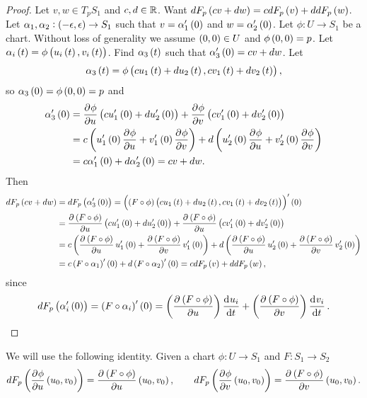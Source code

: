 \begin{proof}
Let $ v, w \in T_pS_1 $ and $ c, d \in \mathbb{R} $. Want $ dF_p\br{cv + dw} = cdF_p\br{v} + ddF_p\br{w} $. Let $ \alpha_1, \alpha_2 : \br{-\epsilon, \epsilon} \to S_1 $ such that $ v = \alpha_1'\br{0} $ and $ w = \alpha_2'\br{0} $. Let $ \phi : U \to S_1 $ be a chart. Without loss of generality we assume $ \br{0, 0} \in U $ and $ \phi\br{0, 0} = p $. Let $ \alpha_i\br{t} = \phi\br{u_i\br{t}, v_i\br{t}} $. Find $ \alpha_3\br{t} $ such that $ \alpha_3'\br{0} = cv + dw $. Let
$$ \alpha_3\br{t} = \phi\br{cu_1\br{t} + du_2\br{t}, cv_1\br{t} + dv_2\br{t}}, $$
so $ \alpha_3\br{0} = \phi\br{0, 0} = p $ and
\begin{align*}
\alpha_3'\br{0}
& = \dpd{\phi}{u}\br{cu_1'\br{0} + du_2'\br{0}} + \dpd{\phi}{v}\br{cv_1'\br{0} + dv_2'\br{0}} \\
& = c\br{u_1'\br{0}\dpd{\phi}{u} + v_1'\br{0}\dpd{\phi}{v}} + d\br{u_2'\br{0}\dpd{\phi}{u} + v_2'\br{0}\dpd{\phi}{v}} \\
& = c\alpha_1'\br{0} + d\alpha_2'\br{0} = cv + dw.
\end{align*}
Then
\begin{align*}
dF_p\br{cv + dw}
& = dF_p\br{\alpha_3'\br{0}}
= \br{\br{F \circ \phi}\br{cu_1\br{t} + du_2\br{t}, cv_1\br{t} + dv_2\br{t}}}'\br{0} \\
& = \dpd{\br{F \circ \phi}}{u}\br{cu_1'\br{0} + du_2'\br{0}} + \dpd{\br{F \circ \phi}}{u}\br{cv_1'\br{0} + dv_2'\br{0}} \\
& = c\br{\dpd{\br{F \circ \phi}}{u}u_1'\br{0} + \dpd{\br{F \circ \phi}}{v}v_1'\br{0}} + d\br{\dpd{\br{F \circ \phi}}{u}u_2'\br{0} + \dpd{\br{F \circ \phi}}{v}v_2'\br{0}} \\
& = c\br{F \circ \alpha_1}'\br{0} + d\br{F \circ \alpha_2}'\br{0} = cdF_p\br{v} + ddF_p\br{w},
\end{align*}
since
$$ dF_p\br{\alpha_i'\br{0}} = \br{F \circ \alpha_i}'\br{0} = \br{\dpd{\br{F \circ \phi}}{u}}\dod{u_i}{t} + \br{\dpd{\br{F \circ \phi}}{v}}\dod{v_i}{t}. $$
\end{proof}

\pagebreak

\begin{remark*}
We will use the following identity. Given a chart $ \phi : U \to S_1 $ and $ F : S_1 \to S_2 $
$$ dF_p\br{\dpd{\phi}{u}\br{u_0, v_0}} = \dpd{\br{F \circ \phi}}{u}\br{u_0, v_0}, \qquad dF_p\br{\dpd{\phi}{v}\br{u_0, v_0}} = \dpd{\br{F \circ \phi}}{v}\br{u_0, v_0}. $$
\end{remark*}

